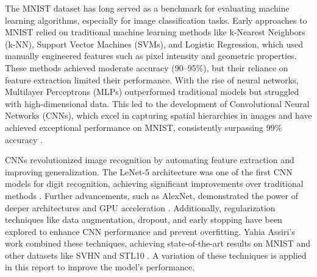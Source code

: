 The MNIST dataset has long served as a benchmark for evaluating machine learning algorithms, 
especially for image classification tasks. Early approaches to MNIST relied on traditional machine 
learning methods like k-Nearest Neighbors (k-NN), Support Vector Machines (SVMs), and Logistic 
Regression, which used manually engineered features such as pixel intensity and geometric 
properties. These methods achieved moderate accuracy (90–95\%), but their reliance on feature 
extraction limited their performance. With the rise of neural networks, Multilayer Perceptrons 
(MLPs) outperformed traditional models but struggled with high-dimensional data. This led to the 
development of Convolutional Neural Networks (CNNs), which excel in capturing spatial hierarchies 
in images and have achieved exceptional performance on MNIST, consistently surpassing 99\% 
accuracy \cite{LeCun1998}.

CNNs revolutionized image recognition by automating feature extraction and improving 
generalization. The LeNet-5 architecture was one of the first CNN models for digit recognition, 
achieving significant improvements over traditional methods \cite{LeCun1998}. Further 
advancements, such as AlexNet, demonstrated the power of deeper architectures and GPU acceleration 
\cite{Krizhevsky2012}. Additionally, regularization techniques like data augmentation, dropout, 
and early stopping have been explored to enhance CNN performance and prevent overfitting. Yahia 
Assiri’s work combined these techniques, achieving state-of-the-art results on MNIST and other 
datasets like SVHN and STL10 \cite{Assiri2020}. A variation of these techniques is applied in this 
report to improve the model's performance.
